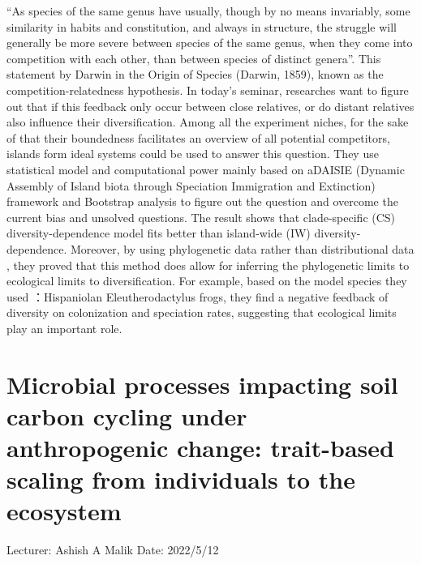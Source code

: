 \documentclass[11pt]{article}
\begin{document}
“As species of the same genus have usually, though by no means invariably, some similarity in habits and constitution, and always in structure, the struggle will generally be more severe between species of the same genus, when they come into competition with each other, than between species of distinct genera”. This statement by Darwin in the Origin of Species (Darwin, 1859), known as the competition-relatedness hypothesis. In today's seminar, researches want to figure out that if this feedback only occur between close relatives, or do distant relatives also influence their diversification. Among all the experiment niches, for the sake of that their boundedness facilitates an overview of all potential competitors, islands form ideal systems could be used to answer this question. They use statistical model and computational power mainly based on aDAISIE (Dynamic Assembly of Island biota through Speciation Immigration and Extinction) framework and Bootstrap analysis to figure out the question and overcome the current bias and unsolved questions. The result shows that clade-specific (CS) diversity-dependence model fits better than island-wide (IW) diversity-dependence. Moreover, by using phylogenetic data rather than distributional data , they proved that this method does allow for inferring the phylogenetic limits to ecological limits to diversification. For example, based on the model species they used ：Hispaniolan Eleutherodactylus frogs, they find a negative feedback of diversity on colonization and speciation rates, suggesting that ecological limits play an important role. 

\newpage

\section{Microbial processes impacting soil carbon cycling under anthropogenic change: trait-based scaling from individuals to the ecosystem}
Lecturer: Ashish A Malik
\newline
Date: 2022/5/12
\newline
\end{document}
